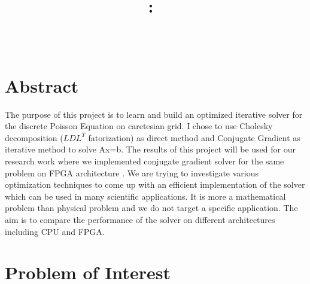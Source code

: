 \documentclass{article}
\title{\vspace{2in}\textmd{\textbf{\hmwkClass:\ \hmwkTitle}} \\
\vspace{0.1in}\large{ \hmwkClassTime}\vspace{3in}}
\author{\textbf{\hmwkAuthorName} \\ \vspace{0.1in}
\hmwkDueDate }
\date{} %
\begin{document}
\begin{spacing}{1.1}
\maketitle

\newpage
\section*{Abstract}

The purpose of this project is to learn and build an optimized iterative solver for the discrete Poisson Equation on caretesian grid.
I chose to use Cholesky decomposition ($LDL^T$ fatorization) as direct method and Conjugate Gradient as iterative method to solve {Ax=b}.
The results of this project will be used for our research work where we implemented conjugate gradient solver for the same problem on FPGA architecture \cite{FPGACG}. We are trying to investigate various optimization techniques to come up with an efficient implementation of the solver which can be used in many scientific applications. It is more a mathematical problem than physical problem and we do not target a specific application. The aim is to compare the performance of the solver on different architectures including CPU and FPGA.
\section{Problem of Interest}


\end{spacing}
\end{document}
